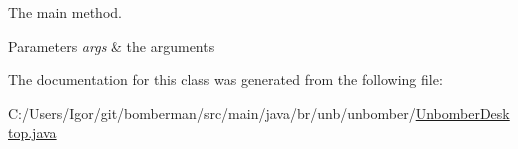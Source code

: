 The main method. 


\begin{DoxyParams}{Parameters}
{\em args} & the arguments \\
\hline
\end{DoxyParams}


The documentation for this class was generated from the following file\+:\begin{DoxyCompactItemize}
\item 
C\+:/\+Users/\+Igor/git/bomberman/src/main/java/br/unb/unbomber/\hyperlink{_unbomber_desktop_8java}{Unbomber\+Desktop.\+java}\end{DoxyCompactItemize}
